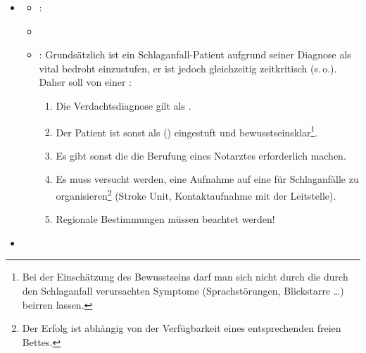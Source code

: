 \documentclass[
ngerman,
paper=a4,
asymmetric,
fontsize=10pt,
headings=small,
draft=false,
openany,
numbers=noenddot,
bibtotocnumbered,
footnotes=multiple,
toc=flat,
]{scrreprt}
\begin{document}
{\begin{itemize}
  \item \TxMassVitMKBes
  \begin{itemize}
    \item {}: 
    \item {} 
    \item {}: Grundsätzlich ist ein
    Schlaganfall-Patient aufgrund seiner Diagnose als vital
    bedroht einzustufen, er ist jedoch gleichzeitig zeitkritisch (s.\,o.).
    Daher soll von einer
    :
    \begin{enumerate}
      \item Die Verdachtsdiagnose gilt als .
      \item Der Patient ist sonst als  () eingestuft
      und
      bewusstseinsklar\footnote{Bei der Einschätzung des Bewusstseins
      darf man sich nicht durch die durch den Schlaganfall
      verursachten Symptome (Sprachstörungen, Blickstarre \ldots)
      beirren lassen.}.
      \item Es gibt sonst  die die Berufung
      eines Notarztes erforderlich machen.
      \item Es muss versucht werden, eine Aufnahme auf eine
       für Schlaganfälle zu
      organisieren\footnote{Der Erfolg ist abhängig von der
      Verfügbarkeit eines entsprechenden freien Bettes.} (Stroke Unit,
      Kontaktaufnahme mit der Leitstelle).
      \item Regionale Bestimmungen müssen beachtet werden!
    \end{enumerate}
  \end{itemize}
  \item  {}
\end{itemize}}
\end{document}

